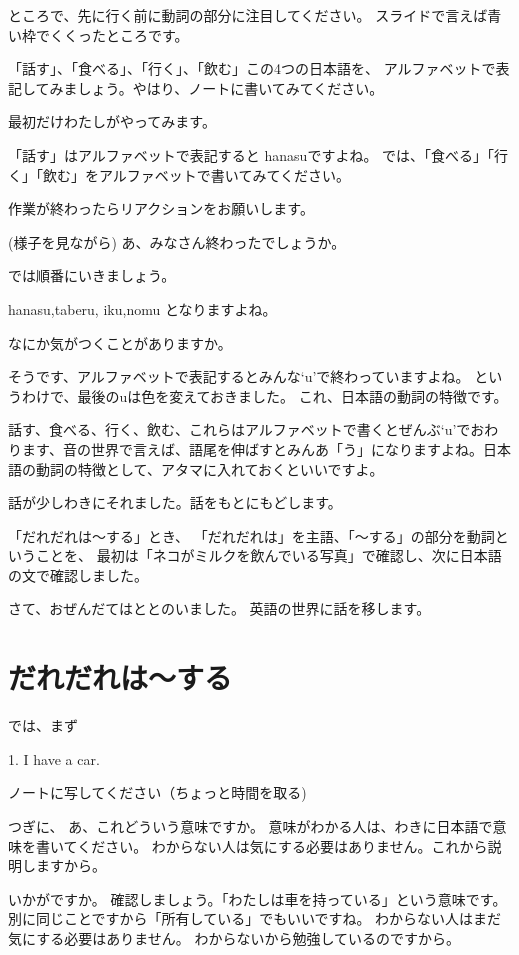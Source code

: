 \documentclass[book,jafontscale=0.9247]{jlreq}
\begin{document}
ところで、先に行く前に動詞の部分に注目してください。
スライドで言えば青い枠でくくったところです。

「話す」、「食べる」、「行く」、「飲む」この4つの日本語を、
アルファベットで表記してみましょう。やはり、ノートに書いてみてください。

最初だけわたしがやってみます。

「話す」はアルファベットで表記すると
\ComputerMouse{}hanasuですよね。
では、「食べる」「行く」「飲む」をアルファベットで書いてみてください。

作業が終わったらリアクションをお願いします。

(様子を見ながら)
あ、みなさん終わったでしょうか。

では順番にいきましょう。

hanasu,taberu,
iku,nomu
となりますよね。

なにか気がつくことがありますか。

そうです、アルファベットで表記するとみんな`u'で終わっていますよね。
というわけで、最後のuは色を変えておきました。
これ、日本語の動詞の特徴です。

話す、食べる、行く、飲む、これらはアルファベットで書くとぜんぶ`u'でおわります、音の世界で言えば、語尾を伸ばすとみんあ「う」になりますよね。日本語の動詞の特徴として、アタマに入れておくといいですよ。

話が少しわきにそれました。話をもとにもどします。

「だれだれは〜する」とき、
「だれだれは」を主語、「〜する」の部分を動詞ということを、
最初は「ネコがミルクを飲んでいる写真」で確認し、次に日本語の文で確認しました。

さて、おぜんだてはととのいました。
英語の世界に話を移します。

{\large \ComputerMouse}
\section{だれだれは〜する}
では、まず

1. I have a car.

ノートに写してください（ちょっと時間を取る)

つぎに、
あ、これどういう意味ですか。
意味がわかる人は、わきに日本語で意味を書いてください。
わからない人は気にする必要はありません。これから説明しますから。

いかがですか。
確認しましょう。{\large \ComputerMouse}「わたしは車を持っている」という意味です。別に同じことですから「所有している」でもいいですね。
わからない人はまだ気にする必要はありません。
わからないから勉強しているのですから。
\end{document}
